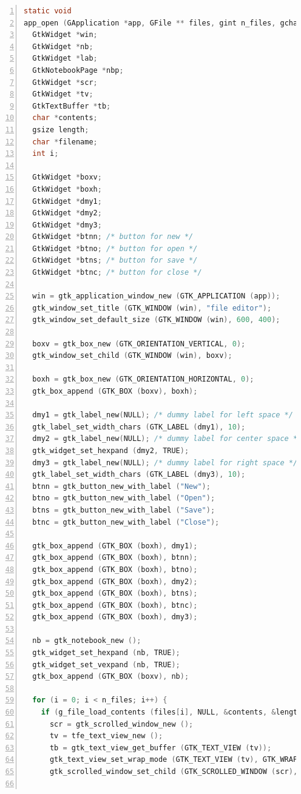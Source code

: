 \begin{lstlisting}[language=C, numbers=left]
static void
app_open (GApplication *app, GFile ** files, gint n_files, gchar *hint, gpointer user_data) {
  GtkWidget *win;
  GtkWidget *nb;
  GtkWidget *lab;
  GtkNotebookPage *nbp;
  GtkWidget *scr;
  GtkWidget *tv;
  GtkTextBuffer *tb;
  char *contents;
  gsize length;
  char *filename;
  int i;

  GtkWidget *boxv;
  GtkWidget *boxh;
  GtkWidget *dmy1;
  GtkWidget *dmy2;
  GtkWidget *dmy3;
  GtkWidget *btnn; /* button for new */
  GtkWidget *btno; /* button for open */
  GtkWidget *btns; /* button for save */
  GtkWidget *btnc; /* button for close */

  win = gtk_application_window_new (GTK_APPLICATION (app));
  gtk_window_set_title (GTK_WINDOW (win), "file editor");
  gtk_window_set_default_size (GTK_WINDOW (win), 600, 400);

  boxv = gtk_box_new (GTK_ORIENTATION_VERTICAL, 0);
  gtk_window_set_child (GTK_WINDOW (win), boxv);

  boxh = gtk_box_new (GTK_ORIENTATION_HORIZONTAL, 0);
  gtk_box_append (GTK_BOX (boxv), boxh);

  dmy1 = gtk_label_new(NULL); /* dummy label for left space */
  gtk_label_set_width_chars (GTK_LABEL (dmy1), 10);
  dmy2 = gtk_label_new(NULL); /* dummy label for center space */
  gtk_widget_set_hexpand (dmy2, TRUE);
  dmy3 = gtk_label_new(NULL); /* dummy label for right space */
  gtk_label_set_width_chars (GTK_LABEL (dmy3), 10);
  btnn = gtk_button_new_with_label ("New");
  btno = gtk_button_new_with_label ("Open");
  btns = gtk_button_new_with_label ("Save");
  btnc = gtk_button_new_with_label ("Close");

  gtk_box_append (GTK_BOX (boxh), dmy1);
  gtk_box_append (GTK_BOX (boxh), btnn);
  gtk_box_append (GTK_BOX (boxh), btno);
  gtk_box_append (GTK_BOX (boxh), dmy2);
  gtk_box_append (GTK_BOX (boxh), btns);
  gtk_box_append (GTK_BOX (boxh), btnc);
  gtk_box_append (GTK_BOX (boxh), dmy3);

  nb = gtk_notebook_new ();
  gtk_widget_set_hexpand (nb, TRUE);
  gtk_widget_set_vexpand (nb, TRUE);
  gtk_box_append (GTK_BOX (boxv), nb);

  for (i = 0; i < n_files; i++) {
    if (g_file_load_contents (files[i], NULL, &contents, &length, NULL, NULL)) {
      scr = gtk_scrolled_window_new ();
      tv = tfe_text_view_new ();
      tb = gtk_text_view_get_buffer (GTK_TEXT_VIEW (tv));
      gtk_text_view_set_wrap_mode (GTK_TEXT_VIEW (tv), GTK_WRAP_WORD_CHAR);
      gtk_scrolled_window_set_child (GTK_SCROLLED_WINDOW (scr), tv);


\end{lstlisting}
